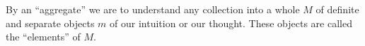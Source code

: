 \documentclass[preview]{standalone}
\begin{document}
\begin{flushleft}
By an ``aggregate'' we are to understand any collection into a whole $M$ of definite and separate objects $m$ of our intuition or our thought. These objects are called the ``elements'' of $M$.
\end{flushleft}
\end{document}
